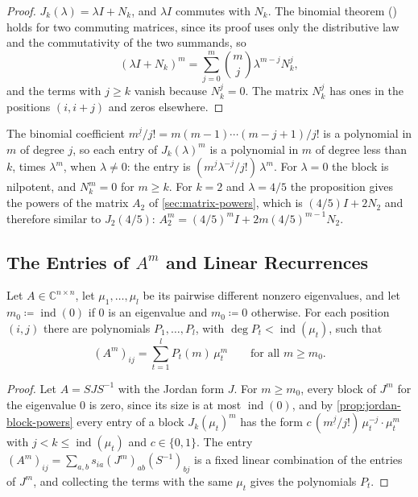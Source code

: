 \begin{proof}
$J_k(\lambda)=\lambda I+N_k$, and $\lambda I$ commutes with $N_k$. The binomial theorem () holds for two commuting matrices, since its proof uses only the distributive law and the commutativity of the two summands, so
\[
(\lambda I+N_k)^m=\sum_{j=0}^m\binom mj\lambda^{m-j}N_k^j ,
\]
and the terms with $j\ge k$ vanish because $N_k^j=0$. The matrix $N_k^j$ has ones in the positions $(i,i+j)$ and zeros elsewhere.
\end{proof}

The binomial coefficient $m^{\underline j}/j!=m(m-1)\cdots(m-j+1)/j!$ is a polynomial in $m$ of degree $j$, so each entry of $J_k(\lambda)^m$ is a polynomial in $m$ of degree less than $k$, times $\lambda^m$, when $\lambda\ne0$: the entry is $(m^{\underline j}\lambda^{-j}/j!)\,\lambda^m$. For $\lambda=0$ the block is nilpotent, and $N_k^m=0$ for $m\ge k$. For $k=2$ and $\lambda=4/5$ the proposition gives the powers of the matrix $A_2$ of \cref{sec:matrix-powers}, which is $(4/5)I+2N_2$ and therefore similar to $J_2(4/5)$: $A_2^m=(4/5)^mI+2m(4/5)^{m-1}N_2$.

\subsection{The Entries of \texorpdfstring{$A^m$}{Am} and Linear Recurrences}

\begin{theorem}
\label{thm:power-entries}
Let $A\in\mathbb C^{n\times n}$, let $\mu_1,\ldots,\mu_l$ be its pairwise different nonzero eigenvalues, and let $m_0\coloneqq\operatorname{ind}(0)$ if $0$ is an eigenvalue and $m_0\coloneqq0$ otherwise. For each position $(i,j)$ there are polynomials $P_1,\ldots,P_l$, with $\deg P_t<\operatorname{ind}(\mu_t)$, such that
\[
(A^m)_{ij}=\sum_{t=1}^lP_t(m)\,\mu_t^m\qquad\text{for all }m\ge m_0 .
\]
\end{theorem}

\begin{proof}
Let $A=SJS^{-1}$ with the Jordan form $J$. For $m\ge m_0$, every block of $J^m$ for the eigenvalue $0$ is zero, since its size is at most $\operatorname{ind}(0)$, and by \cref{prop:jordan-block-powers} every entry of a block $J_k(\mu_t)^m$ has the form $c\,(m^{\underline j}/j!)\,\mu_t^{-j}\cdot\mu_t^m$ with $j<k\le\operatorname{ind}(\mu_t)$ and $c\in\{0,1\}$. The entry $(A^m)_{ij}=\sum_{a,b}s_{ia}(J^m)_{ab}(S^{-1})_{bj}$ is a fixed linear combination of the entries of $J^m$, and collecting the terms with the same $\mu_t$ gives the polynomials $P_t$.
\end{proof}

